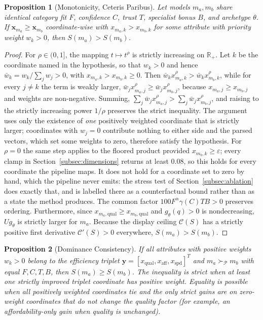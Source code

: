 \documentclass[pdflatex,sn-mathphys-num]{sn-jnl}
\theoremstyle{thmstyleone}
\newtheorem{proposition}{Proposition}
\theoremstyle{thmstylethree}
\begin{document}
\begin{proposition}[Monotonicity, Ceteris Paribus]\label{prop:monotonicity}
Let models $m_a, m_b$ share identical category fit $F$, confidence $C$, trust $T$, specialist bonus $B$, and archetype $\theta$. If $\mathbf{x}_{m_a} \ge \mathbf{x}_{m_b}$ coordinate-wise with $x_{m_a, k} > x_{m_b, k}$ for some attribute with priority weight $w_k > 0$, then $S(m_a) > S(m_b)$.
\end{proposition}

\begin{proof}
For $\rho \in (0, 1]$, the mapping $t \mapsto t^\rho$ is strictly increasing on $\mathbb{R}_+$. Let $k$ be the coordinate named in the hypothesis, so that $w_k > 0$ and hence $\bar{w}_k = w_k / \sum_j w_j > 0$, with $x_{m_a, k} > x_{m_b, k} \ge 0$. Then $\bar{w}_k x_{m_a, k}^\rho > \bar{w}_k x_{m_b, k}^\rho$, while for every $j \ne k$ the term is weakly larger, $\bar{w}_j x_{m_a, j}^\rho \ge \bar{w}_j x_{m_b, j}^\rho$, because $x_{m_a, j} \ge x_{m_b, j}$ and weights are non-negative. Summing, $\sum_j \bar{w}_j x_{m_a, j}^\rho > \sum_j \bar{w}_j x_{m_b, j}^\rho$, and raising to the strictly increasing power $1/\rho$ preserves the strict inequality. The argument uses only the existence of \emph{one} positively weighted coordinate that is strictly larger; coordinates with $w_j = 0$ contribute nothing to either side and the parsed vectors, which set some weights to zero, therefore satisfy the hypothesis. For $\rho = 0$ the same step applies to the floored product provided $x_{m_b, k} \ge \varepsilon$; every clamp in Section~\ref{subsec:dimensions} returns at least $0.08$, so this holds for every coordinate the pipeline maps. It does not hold for a coordinate set to zero by hand, which the pipeline never emits: the stress test of Section~\ref{subsec:ablation} does exactly that, and is labelled there as a counterfactual bound rather than as a state the method produces. The common factor $100 F^\alpha \gamma(C) T B > 0$ preserves ordering. Furthermore, since $x_{m_a, \text{qual}} \ge x_{m_b, \text{qual}}$ and $g_\theta(q) > 0$ is nondecreasing, $U g_\theta$ is strictly larger for $m_a$. Because the display ceiling $\mathcal{C}(S)$ has a strictly positive first derivative $\mathcal{C}'(S) > 0$ everywhere, $S(m_a) > S(m_b)$.
\end{proof}

\begin{proposition}[Dominance Consistency]\label{prop:dominance}
If all attributes with positive weights $w_k > 0$ belong to the efficiency triplet $\mathbf{y} = [x_{\text{qual}}, x_{\text{aff}}, x_{\text{spd}}]^T$ and $m_a \succ_{\mathcal{P}} m_b$ with equal $F, C, T, B$, then $S(m_a) \ge S(m_b)$. The inequality is strict when at least one strictly improved triplet coordinate has positive weight. Equality is possible when all positively weighted coordinates tie and the only strict gains are on zero-weight coordinates that do not change the quality factor (for example, an affordability-only gain when quality is unchanged).
\end{proposition}
\end{document}
